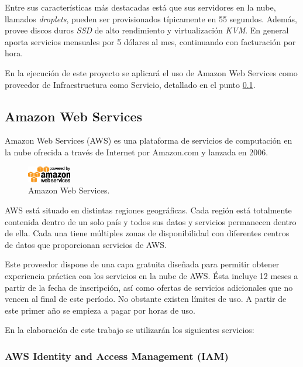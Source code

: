 Entre sus características más destacadas está que sus servidores en la nube, llamados \textit{droplets}, pueden ser provisionados típicamente en 55 segundos. Además, provee discos duros \textit{SSD} de alto rendimiento y virtualización \textit{KVM}. En general aporta servicios mensuales por 5 dólares al mes, continuando con facturación por hora.

En la ejecución de este proyecto se aplicará el uso de Amazon Web Services como proveedor de Infraestructura como Servicio, detallado en el punto \hyperref[subAWS]{\ref{subAWS}}.

\subsection{Amazon Web Services} \label{subAWS}

Amazon Web Services (AWS) es una plataforma de servicios de computación en la nube ofrecida a través de Internet por Amazon.com y lanzada en 2006.

\begin{figure}[H]
\centering
\includegraphics[width=0.17\textwidth]{images/figures/aws.png}
\caption{Amazon Web Services.\footnotemark}
\end{figure}


AWS está situado en distintas regiones geográficas. Cada región está totalmente contenida dentro de un solo país y todos sus datos y servicios permanecen dentro de ella. Cada una tiene múltiples zonas de disponibilidad con diferentes centros de datos que proporcionan servicios de AWS.

Este proveedor dispone de una capa gratuita diseñada para permitir obtener experiencia práctica con los servicios en la nube de AWS. Ésta incluye 12 meses a partir de la fecha de inscripción, así como ofertas de servicios adicionales que no vencen al final de este período. No obstante existen límites de uso. A partir de este primer año se empieza a pagar por horas de uso.

En la elaboración de este trabajo se utilizarán los siguientes servicios:

\subsubsection{AWS Identity and Access Management (IAM)}

